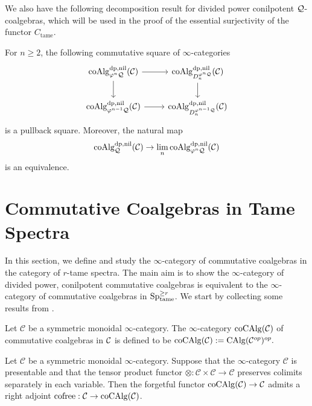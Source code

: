 We also have the following decomposition result for divided power conilpotent ${\mathcal{Q}}$-coalgebras, which will be used in the proof of the essential surjectivity of the functor $C_{\operatorname{tame}}$.
\begin{proposition}
\cite[Theorem 4.13]{Heuts_Koszul}
\label{inductive construction of coalgebras}
    For $n\geq 2$, the following commutative square of $\infty$-categories 
\[
\begin{tikzcd}
	\coAlg^{\divpow, \nil}_{\varphi^n \CQ}(\CC) & 
	\coAlg^{\divpow, \nil}_{D_n^{\varphi^{n}\CQ}}(\CC)\\
	\coAlg^{\divpow, \nil}_{\varphi^{n-1} \CQ}(\CC) & 
	\coAlg^{\divpow, \nil}_{D_n^{\varphi^{n-1}\CQ}}(\CC)
	\arrow[from=1-1, to= 1-2]
	\arrow[from=1-1, to=2-1]
	\arrow[from=1-2, to=2-2]
	\arrow[from=2-1, to= 2-2]
\end{tikzcd}
\]
is a pullback square. Moreover, the natural map
$$
\operatorname{coAlg}^{\operatorname{dp}, \operatorname{nil}}_{{\mathcal{Q}}}({\mathcal{C}}) \to \lim_n \operatorname{coAlg}^{\operatorname{dp}, \operatorname{nil}}_{\varphi^n{\mathcal{Q}}}({\mathcal{C}})
$$
is an equivalence.
\end{proposition}

\section{Commutative Coalgebras in Tame Spectra}
\label{Commutative coalgebras in tame spectra}

In this section, we define and study the $\infty$-category of commutative coalgebras in the category of $r$-tame spectra. 
The main aim is to show the $\infty$-category of divided power, conilpotent commutative coalgebras is equivalent to the $\infty$-category of commutative coalgebras in $\operatorname{Sp}^{\geq r}_{\operatorname{\operatorname{tame}}}$.
We start by collecting some results from \cite{LurieEllipticI}.

\begin{definition}
    Let $\mathcal{C}$ be a symmetric monoidal $\infty$-category. The $\infty$-category $\operatorname{coCAlg}({\mathcal{C}})$ of commutative coalgebras in ${\mathcal{C}}$ is defined to be
    $
    \operatorname{coCAlg}({\mathcal{C}}):= \operatorname{CAlg}({\mathcal{C}}^{op})^{op}.
    $
\end{definition}



\begin{proposition}
\label{Cor 3.1.5. Ellip}
\cite[Corollary 3.1.5]{LurieEllipticI}
	Let $\mathcal{C}$ be a symmetric monoidal $\infty$-category. Suppose that the $\infty$-category $\mathcal{C}$ is presentable and that the tensor product functor $\otimes: \mathcal{C} \times \mathcal{C} \rightarrow \mathcal{C}$ preserves colimits separately in each variable. Then the forgetful functor $\operatorname{coCAlg}(\mathcal{C}) \rightarrow \mathcal{C}$ admits a right adjoint $\operatorname{cofree}: \mathcal{C} \rightarrow \operatorname{coCAlg}(\mathcal{C})$.
\end{proposition}



